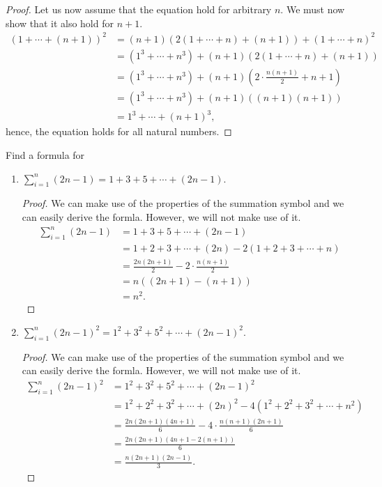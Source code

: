 \begin{exercise}[\textbf{1}]
\begin{enumerate}
\begin{proof}
              Let us now assume that the equation hold for
              arbitrary $n$. We must now show that it also hold for $n+1$.
              \begin{align*}
                  (1+\dotsb +(n+1))^2 &= (n+1)(2(1+\dotsb +n)+(n+1)) + (1+\dotsb +n)^2 \\
                  &= (1^3+\dotsb +n^3)+(n+1)(2(1+\dotsb +n)+(n+1)) \\
                  &= (1^3+\dotsb +n^3) + (n+1)(2\cdot \frac{n(n+1)}{2}+n+1) \\
                  &= (1^3+\dotsb +n^3) + (n+1)((n+1)(n+1)) \\
                  &= 1^3+\dotsb +(n+1)^3,
              \end{align*}
              hence, the equation holds for all natural numbers.
         \end{proof}
     \end{enumerate}
\end{exercise}
\begin{exercise}[\textbf{2}] Find a formula for 
     \begin{enumerate}
        \item $\sum \limits_{i=1} ^{n} (2n-1) = 1+3+5+\dotsb +(2n-1)$.
        \begin{proof}We can make use of the properties of the summation symbol
        and we can easily derive the formla. However, we will not make use of it.
             \begin{align*}
                \sum \limits_{i=1} ^{n} (2n-1) &= 1+3+5+\dotsb +(2n-1) \\
                &= 1+2+3+\dotsb +(2n) - 2(1+2+3+\dotsb +n) \\
                &= \frac{2n(2n+1)}{2} - 2\cdot \frac{n(n+1)}{2} \\
                &= n((2n+1)-(n+1)) \\
                &=n^2.
             \end{align*}
        \end{proof}
        \item $\sum \limits_{i=1} ^{n} (2n-1)^2 = 1^2+3^2+5^2+\dotsb +(2n-1)^2$.
        \begin{proof} We can make use of the properties of the summation symbol
            and we can easily derive the formla. However, we will not make use of it.
             \begin{align*}
                \sum \limits_{i=1} ^{n} (2n-1)^2 &= 1^2+3^2+5^2+\dotsb +(2n-1)^2 \\
                &= 1^2+2^2+3^2+\dotsb +(2n)^2 - 4(1^2+2^2+3^2+\dotsb +n^2) \\
                &= \frac{2n(2n+1)(4n+1)}{6} - 4\cdot \frac{n(n+1)(2n+1)}{6} \\
                &= \frac{2n(2n+1)\left(4n+1-2(n+1)\right)}{6} \\
                &= \frac{n(2n+1)(2n-1)}{3}.
             \end{align*}
        \end{proof}
     \end{enumerate}
\end{exercise}